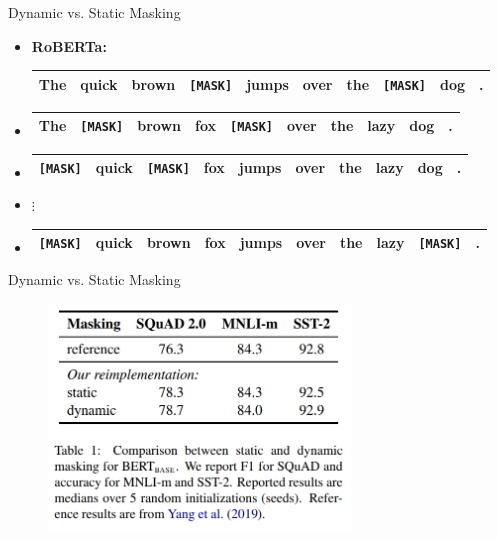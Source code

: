 \begin{frame}{Dynamic vs. Static Masking}
\begin{itemize}
	\item \normalsize \textbf{RoBERTa:}
			\footnotesize
\begin{tabular}{|cccccccccc|}
\hline
The & quick & brown & \cellcolor{blue!65}\texttt{[MASK]} & jumps & over & the & \cellcolor{blue!65}\texttt{[MASK]} & dog & . \\
\hline
\end{tabular}
	\item[] \footnotesize
\begin{tabular}{|cccccccccc|}
\hline
The & \cellcolor{blue!65}\texttt{[MASK]} & brown & fox & \cellcolor{blue!65}\texttt{[MASK]} & over & the & lazy & dog & . \\
\hline
\end{tabular}
	\item[] \footnotesize
\begin{tabular}{|cccccccccc|}
\hline
\cellcolor{blue!65}\texttt{[MASK]} & quick & \cellcolor{blue!65}\texttt{[MASK]} & fox & jumps & over & the & lazy & dog & . \\
\hline
\end{tabular}
	\item[] \begin{center}$\vdots$\end{center}
	\item[] \footnotesize
\begin{tabular}{|cccccccccc|}
\hline
\cellcolor{blue!65}\texttt{[MASK]} & quick & brown & fox & jumps & over & the & lazy & \cellcolor{blue!65}\texttt{[MASK]} & . \\
\hline
\end{tabular}
\end{itemize}

\vfill

\end{frame}


\begin{frame}{Dynamic vs. Static Masking}

\vfill

\begin{figure}
\centering
\includegraphics[width = 8cm]{figure/roberta-dynamic.png}\\ 
\end{figure}

\vfill

\end{frame}

